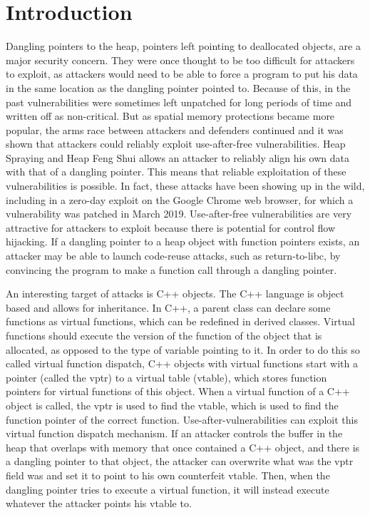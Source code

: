 \documentclass[conference]{IEEEtran}
\begin{document}
\section{Introduction}
Dangling pointers to the heap, pointers left pointing to deallocated objects, 
are a major security concern. They were once thought to be too difficult for 
attackers to exploit, as attackers would need to be able to force a program 
to put his data in the same location as the dangling pointer pointed to. 
Because of this, in the past vulnerabilities were sometimes left unpatched 
for long periods of time and written off as non-critical. But as spatial 
memory protections became more popular, the arms race between attackers and 
defenders continued and it was shown that attackers could reliably exploit 
use-after-free vulnerabilities. Heap Spraying and Heap Feng Shui allows an 
attacker to reliably align his own data with that of a dangling pointer. 
This means that reliable exploitation of these vulnerabilities is possible. 
In fact, these attacks have been showing up in the wild, including 
in a zero-day exploit on the Google Chrome web browser, for which a 
vulnerability was patched in March 2019. Use-after-free vulnerabilities are 
very attractive for attackers to exploit because there is potential for 
control flow hijacking. If a dangling pointer to a heap object with 
function pointers exists, an attacker may be able to launch code-reuse 
attacks, such as return-to-libc, by convincing the program to make a 
function call through a dangling pointer.  

An interesting target of attacks is C++ objects.  The C++ language is object based and 
allows for inheritance. In C++, a parent class can declare some functions 
as virtual functions, which can be redefined in derived classes. Virtual 
functions should execute the version of the function of the object that 
is allocated, as opposed to the type of variable pointing to it. In order 
to do this so called virtual function dispatch, C++ objects with virtual 
functions start with a pointer (called the vptr) to a virtual table 
(vtable), which stores function pointers for virtual functions of this 
object. When a virtual function of a C++ object is called, the vptr is 
used to find the vtable, which is used to find the function pointer of 
the correct function. Use-after-vulnerabilities can exploit this virtual 
function dispatch mechanism. If an attacker controls the buffer in the 
heap that overlaps with memory that once contained a C++ object, and 
there is a dangling pointer to that object, the attacker can overwrite 
what was the vptr field was and set it to point to his own counterfeit 
vtable. Then, when the dangling pointer tries to execute a virtual 
function, it will instead execute whatever the attacker points his vtable 
to. 
\end{document}
